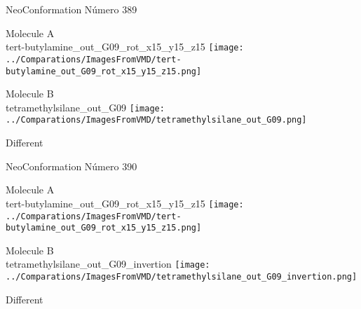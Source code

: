  \newpage

\vtab[-2cm]
\begin{center}
{\large NeoConformation \tab Número 389}
\end{center}
\begin{multicols}{2}
\begin{center}
Molecule A \\ 
tert-butylamine\_out\_G09\_rot\_x15\_y15\_z15
\texttt{[image: ../Comparations/ImagesFromVMD/tert-butylamine\_out\_G09\_rot\_x15\_y15\_z15.png]}
\\
\vtab

\columnbreak
Molecule B \\ 
tetramethylsilane\_out\_G09
\texttt{[image: ../Comparations/ImagesFromVMD/tetramethylsilane\_out\_G09.png]}
\\
\vtab


\end{center}
\end{multicols}
\begin{center}
\vtab
\vtab
\textcolor{NavyBlue}{\Large Different}
\end{center}

 \newpage

\vtab[-2cm]
\begin{center}
{\large NeoConformation \tab Número 390}
\end{center}
\begin{multicols}{2}
\begin{center}
Molecule A \\ 
tert-butylamine\_out\_G09\_rot\_x15\_y15\_z15
\texttt{[image: ../Comparations/ImagesFromVMD/tert-butylamine\_out\_G09\_rot\_x15\_y15\_z15.png]}
\\
\vtab

\columnbreak
Molecule B \\ 
tetramethylsilane\_out\_G09\_invertion
\texttt{[image: ../Comparations/ImagesFromVMD/tetramethylsilane\_out\_G09\_invertion.png]}
\\
\vtab


\end{center}
\end{multicols}
\begin{center}
\vtab
\vtab
\textcolor{NavyBlue}{\Large Different}
\end{center}

 \newpage

